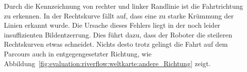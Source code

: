 Durch die Kennzeichnung von rechter und linker Randlinie ist die Fahrtrichtung zu erkennen. In der Rechtskurve fällt auf, dass eine zu starke Krümmung der Linien erkannt wurde. Die Ursache dieses Fehlers liegt in der noch leider insuffizienten Bildentzerrung. Dies führt dazu, dass der Roboter die steileren Rechtskurven etwas schneidet. Nichts desto trotz gelingt die Fahrt auf dem Parcours auch in entgegengesetzter Richtung, wie Abbildung~\ref{fig:evaluation:riverflow:weltkarte:andere_Richtung} zeigt.









